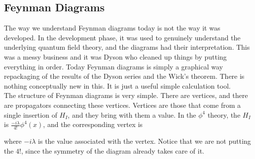 \documentclass[11pt]{article}
\numberwithin{equation}{section}
\begin{document}
    \subsection{Feynman Diagrams}
    The way we understand Feynman diagrams today is not the way it was developed. In the development phase, it was used to genuinely understand the underlying quantum field theory, and the diagrams had their interpretation. This was a messy business and it was Dyson who cleaned up things by putting everything in order. Today Feynman diagrams is simply a graphical way repackaging of the results of the Dyson series and the Wick's theorem. There is nothing conceptually new in this. It is just a useful simple calculation tool. \\

    The structure of Feynman diagrams is very simple. There are vertices, and there are propagators connecting these vertices. Vertices are those that come from a single insertion of \(H_I\), and they bring with them a value. In the \(\phi^4\) theory, the \(H_I\) is \(\displaystyle\frac{-i\lambda}{4!}\phi^4(x)\), and the corresponding vertex is 

    \begin{figure}[h]
        \centering
    \end{figure}
    where \(-i\lambda\) is the value associated with the vertex. Notice that we are not putting the \(4!\), since the symmetry of the diagram already takes care of it.\\
\end{document}
